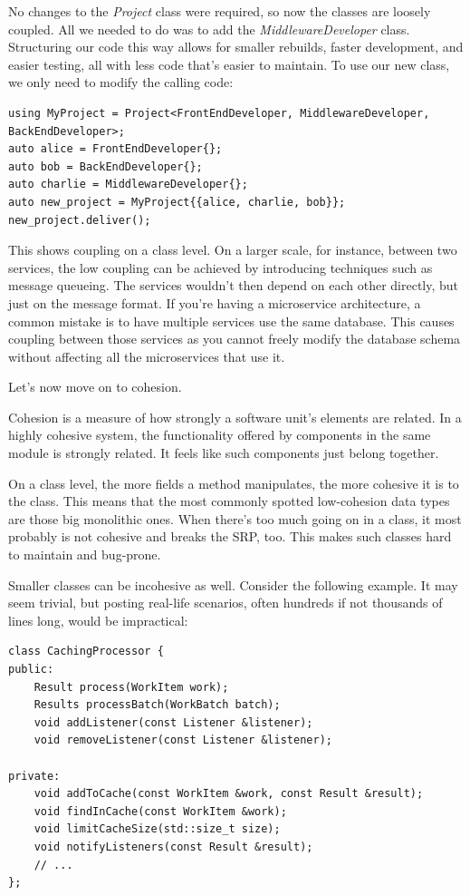 No changes to the \textit{Project} class were required, so now the classes are loosely coupled. All we needed to do was to add the \textit{MiddlewareDeveloper} class. Structuring our code this way allows for smaller rebuilds, faster development, and easier testing, all with less code that's easier to maintain. To use our new class, we only need to modify the calling code:


\begin{lstlisting}[style=styleCXX]
using MyProject = Project<FrontEndDeveloper, MiddlewareDeveloper,
BackEndDeveloper>;
auto alice = FrontEndDeveloper{};
auto bob = BackEndDeveloper{};
auto charlie = MiddlewareDeveloper{};
auto new_project = MyProject{{alice, charlie, bob}};
new_project.deliver();
\end{lstlisting}

This shows coupling on a class level. On a larger scale, for instance, between two services, the low coupling can be achieved by introducing techniques such as message queueing. The services wouldn't then depend on each other directly, but just on the message format. If you're having a microservice architecture, a common mistake is to have multiple services use the same database. This causes coupling between those services as you cannot freely modify the database schema without affecting all the microservices that use it.

Let's now move on to cohesion.


Cohesion is a measure of how strongly a software unit's elements are related. In a highly cohesive system, the functionality offered by components in the same module is strongly related. It feels like such components just belong together.

On a class level, the more fields a method manipulates, the more cohesive it is to the class. This means that the most commonly spotted low-cohesion data types are those big monolithic ones. When there's too much going on in a class, it most probably is not cohesive and breaks the SRP, too. This makes such classes hard to maintain and bug-prone.

Smaller classes can be incohesive as well. Consider the following example. It may seem trivial, but posting real-life scenarios, often hundreds if not thousands of lines long, would be impractical:


\begin{lstlisting}[style=styleCXX]
class CachingProcessor {
public:
	Result process(WorkItem work);
	Results processBatch(WorkBatch batch);
	void addListener(const Listener &listener);
	void removeListener(const Listener &listener);
	
private:
	void addToCache(const WorkItem &work, const Result &result);
	void findInCache(const WorkItem &work);
	void limitCacheSize(std::size_t size);
	void notifyListeners(const Result &result);
	// ...
};
\end{lstlisting}

